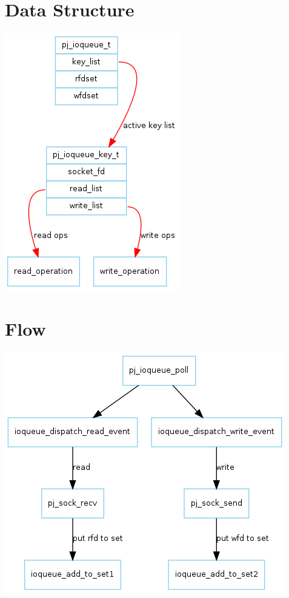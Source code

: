 \documentclass[a4paper, 12pt]{article}
\begin{document}
\begin{CJK}{UTF8}{gkai}
\section{Data Structure}
\includegraphics[width=\textwidth]{ioqueue.png}

\section{Flow}
\includegraphics[width=\textwidth]{ioqueue_flow.png}


\end{CJK}
\end{document}
